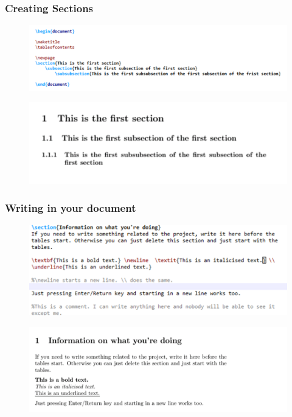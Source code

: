 \documentclass{beamer}
\begin{document}
\begin{frame}[fragile]
	\frametitle{Creating Sections}
	\begin{figure}
		\includegraphics[width=0.7\linewidth]{sections1}
	\end{figure}
 \begin{figure}
 	\centering
 	\includegraphics[width=0.7\linewidth]{sections2}
 \end{figure}
\end{frame}

\begin{frame}[fragile]
	\frametitle{Writing in your document}
	\begin{figure}
		\centering
		\includegraphics[width=0.7\linewidth]{writing}
	\end{figure}
\begin{figure}
	\centering
	\includegraphics[width=0.7\linewidth]{writing1}
\end{figure}
\end{frame}
\end{document}
